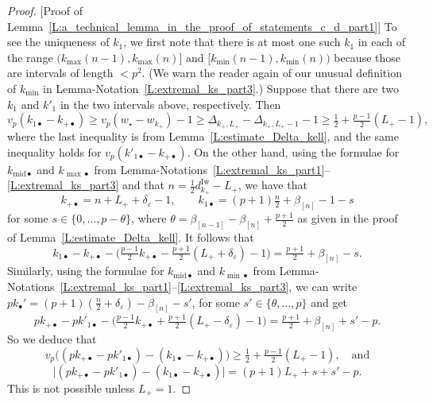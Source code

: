\begin{proof}
    [Proof of Lemma~\ref{L:a_technical_lemma_in_the_proof_of_statements_c_d_part1}]
    To see the uniqueness of $k_1$, we first note that there is at most one such $k_1$ in each of the range $\big( k_{\max}(n-1), k_{\max}(n)\big]$ and $ \big[ k_{\min}(n-1), k_{\min}(n)\big)$ because those are intervals of length $< p^2$. (We warn the reader again of our unusual definition of $k_{\min}$ in Lemma-Notation~\ref{L:extremal_ks_part3}.) Suppose that there are two $k_1$ and $k'_1$ in the two intervals above, respectively. Then
    \begin{equation}
    \label{E:vp_of_k1-k_plus}
    v_p(k_{1\bullet}-k_{+\bullet}) \geq v_p(w_\star - w_{k_+})-1 \geq \Delta_{k_+, L_+}-\Delta_{k_+, L_+-1}-1 \geq \tfrac 12+ \tfrac {p-1}2(L_+-1),
    \end{equation}
    where the last inequality is from Lemma~\ref{L:estimate_Delta_kell}, and the same inequality holds for $v_p(k'_{1\bullet}-k_{+\bullet})$.
    On the other hand, using the formulae for $k_{{\mathrm{mid}}\bullet}$ and $k_{\max\bullet}$ from Lemma-Notations~\ref{L:extremal_ks_part1}--\ref{L:extremal_ks_part3} and that $n = \frac12 d_{k_+}^{\mathrm{Iw}}-L_+$, we have that
    \[
    k_{+\bullet}=n+L_++\delta_\varepsilon-1, \qquad k_{1\bullet}= (p+1)\tfrac {n}2 +  \beta_{[n]}-1-s
    \]
    for some $s \in \{0, \dots, p-\theta\}$,  where $\theta = \beta_{[n-1]}-\beta_{[n]}+\frac{p+1}2$ as given in the proof of Lemma~\ref{L:estimate_Delta_kell}.
    It follows that
    \begin{equation}
    \label{E:k1-k_plus_-s}
    k_{1\bullet} - k_{+\bullet} - \big(\tfrac{p-1}2k_{+\bullet} - \tfrac{p+1}2 (L_++\delta_\varepsilon)-1\big)  = \tfrac{p+1}2 + \beta_{[n]}-s.
    \end{equation}
    Similarly, using the formulae for $k_{{\mathrm{mid}}\bullet}$ and $k_{\min\bullet}$  from Lemma-Notations~\ref{L:extremal_ks_part1}--\ref{L:extremal_ks_part3}, we can write $pk_\bullet'=(p+1)(\frac n2+\delta_{\varepsilon })-\beta_{[n]}-s'$, for some $s'\in \{\theta,\dots, p \}$ and
    get
    $$
    pk_{+\bullet} -pk'_{1\bullet} -  \big(\tfrac{p-1}2k_{+\bullet} + \tfrac{p+1}2( L_+-\delta_\varepsilon)-1\big) =\tfrac{p+1}2+\beta_{[n]}+s'-p.
    $$
    So we deduce that
    $$
    v_p\big( (pk_{+\bullet}-pk'_{1\bullet}) - (k_{1\bullet} - k_{+\bullet})\big)  \geq \tfrac 12 + \tfrac {p-1}2(L_+-1), \quad \textrm{and}
    $$
    $$
    \big|(pk_{+\bullet}-pk'_{1\bullet}) - (k_{1\bullet} - k_{+\bullet})\big| = (p+1)L_+ + s+s'-p.
    $$
    This is not possible unless $L_+  =1$.
\end{proof}

